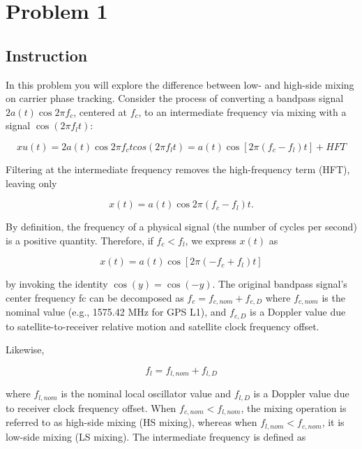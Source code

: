 \section{Problem 1}

\subsection{Instruction}

In this problem you will explore the difference between low- and high-side
mixing on carrier phase tracking. Consider the process of converting a bandpass
signal $2 a(t) \cos{2 \pi f_c}$, centered at $f_c$, to an intermediate frequency
via mixing with a signal $\cos(2 \pi f_l t)$:

\begin{equation}
	xu (t) = 2 a(t) \cos{2 \pi f_c t} cos( 2 \pi f_l t)
	= a(t) \cos{[2 \pi(f_c − f_l ) t]} + HFT
\end{equation}

Filtering at the intermediate frequency removes the high-frequency term (HFT),
leaving only


\begin{equation}
	x(t) = a(t) \cos{ 2 \pi (f_c − f_l ) t }.
\end{equation}

By definition, the frequency of a physical signal (the number of cycles per
second) is a positive quantity. Therefore, if $f_c < f_l$, we express $x(t)$ as

\begin{equation}
	x(t) = a(t) \cos{ [2 \pi (-f_c + f_l ) t] }
\end{equation}

by invoking the identity $\cos(y) = \cos(−y)$.
The original bandpass signal’s center frequency fc can be decomposed as
$f_c = f_{c,nom} + f_{c,D}$ where $f_{c,nom}$ is the nominal value (e.g.,
1575.42 MHz for GPS L1), and $f_{c,D}$ is a Doppler value due to
satellite-to-receiver relative motion and satellite clock frequency offset.

Likewise,

\begin{equation}
	f_l = f_{l,nom} + f_{l,D}
\end{equation}

where $f_{l,nom}$ is the nominal local oscillator value and $f_{l,D}$ is a
Doppler value due to receiver clock frequency offset. When $f_{c,nom} < f_{l,nom}$,
the mixing operation is referred to as high-side mixing
(HS mixing), whereas when $f_{l,nom} < f_{c,nom}$, it is low-side mixing
(LS mixing). The intermediate frequency is defined as

